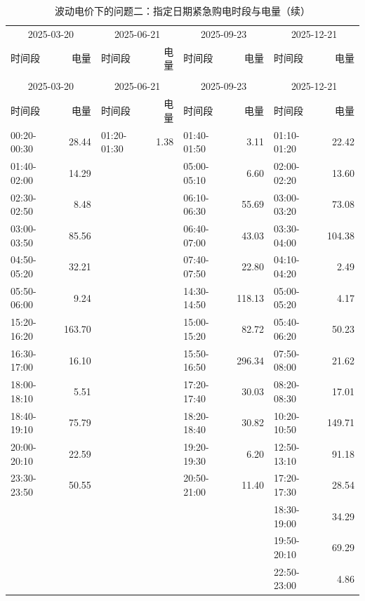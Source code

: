 {\footnotesize\setlength{\tabcolsep}{3pt}
\begin{longtable}{lr|lr|lr|lr}
\caption{波动电价下的问题二：指定日期紧急购电时段与电量（kWh）}\\
\toprule
\multicolumn{2}{c}{2025-03-20} & \multicolumn{2}{c}{2025-06-21} & \multicolumn{2}{c}{2025-09-23} & \multicolumn{2}{c}{2025-12-21}\\
时间段 & 电量 & 时间段 & 电量 & 时间段 & 电量 & 时间段 & 电量\\\midrule\endfirsthead
\caption[]{波动电价下的问题二：指定日期紧急购电时段与电量（续）}\\
\toprule
\multicolumn{2}{c}{2025-03-20} & \multicolumn{2}{c}{2025-06-21} & \multicolumn{2}{c}{2025-09-23} & \multicolumn{2}{c}{2025-12-21}\\
时间段 & 电量 & 时间段 & 电量 & 时间段 & 电量 & 时间段 & 电量\\\midrule\endhead
00:20-00:30 & 28.44 & 01:20-01:30 & 1.38 & 01:40-01:50 & 3.11 & 01:10-01:20 & 22.42\\
01:40-02:00 & 14.29 &  &  & 05:00-05:10 & 6.60 & 02:00-02:20 & 13.60\\
02:30-02:50 & 8.48 &  &  & 06:10-06:30 & 55.69 & 03:00-03:20 & 73.08\\
03:00-03:50 & 85.56 &  &  & 06:40-07:00 & 43.03 & 03:30-04:00 & 104.38\\
04:50-05:20 & 32.21 &  &  & 07:40-07:50 & 22.80 & 04:10-04:20 & 2.49\\
05:50-06:00 & 9.24 &  &  & 14:30-14:50 & 118.13 & 05:00-05:20 & 4.17\\
15:20-16:20 & 163.70 &  &  & 15:00-15:20 & 82.72 & 05:40-06:20 & 50.23\\
16:30-17:00 & 16.10 &  &  & 15:50-16:50 & 296.34 & 07:50-08:00 & 21.62\\
18:00-18:10 & 5.51 &  &  & 17:20-17:40 & 30.03 & 08:20-08:30 & 17.01\\
18:40-19:10 & 75.79 &  &  & 18:20-18:40 & 30.82 & 10:20-10:50 & 149.71\\
20:00-20:10 & 22.59 &  &  & 19:20-19:30 & 6.20 & 12:50-13:10 & 91.18\\
23:30-23:50 & 50.55 &  &  & 20:50-21:00 & 11.40 & 17:20-17:30 & 28.54\\
 &  &  &  &  &  & 18:30-19:00 & 34.29\\
 &  &  &  &  &  & 19:50-20:10 & 69.29\\
 &  &  &  &  &  & 22:50-23:00 & 4.86\\
\bottomrule\end{longtable}}
